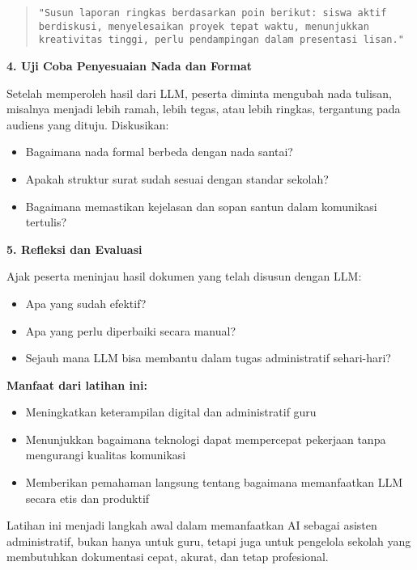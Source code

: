 \begin{quote}
	\centering
	\texttt{"Susun laporan ringkas berdasarkan poin berikut: siswa aktif berdiskusi, menyelesaikan proyek tepat waktu, menunjukkan kreativitas tinggi, perlu pendampingan dalam presentasi lisan."}
\end{quote}

\textbf{4. Uji Coba Penyesuaian Nada dan Format}

Setelah memperoleh hasil dari LLM, peserta diminta mengubah nada tulisan, misalnya menjadi lebih ramah, lebih tegas, atau lebih ringkas, tergantung pada audiens yang dituju. Diskusikan:
\begin{itemize}
	\item Bagaimana nada formal berbeda dengan nada santai?
	\item Apakah struktur surat sudah sesuai dengan standar sekolah?
	\item Bagaimana memastikan kejelasan dan sopan santun dalam komunikasi tertulis?
\end{itemize}

\textbf{5. Refleksi dan Evaluasi}

Ajak peserta meninjau hasil dokumen yang telah disusun dengan LLM:
\begin{itemize}
	\item Apa yang sudah efektif?
	\item Apa yang perlu diperbaiki secara manual?
	\item Sejauh mana LLM bisa membantu dalam tugas administratif sehari-hari?
\end{itemize}

\textbf{Manfaat dari latihan ini:}
\begin{itemize}
	\item Meningkatkan keterampilan digital dan administratif guru
	\item Menunjukkan bagaimana teknologi dapat mempercepat pekerjaan tanpa mengurangi kualitas komunikasi
	\item Memberikan pemahaman langsung tentang bagaimana memanfaatkan LLM secara etis dan produktif
\end{itemize}

Latihan ini menjadi langkah awal dalam memanfaatkan AI sebagai asisten administratif, bukan hanya untuk guru, tetapi juga untuk pengelola sekolah yang membutuhkan dokumentasi cepat, akurat, dan tetap profesional.

